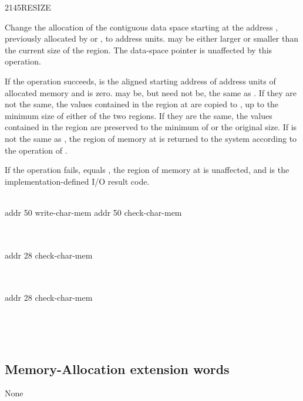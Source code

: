 \vspace*{-3ex}
\begin{worddef}{2145}{RESIZE}
\item {}

	Change the allocation of the contiguous data space starting at
	the address , previously allocated by
	 or , to  address units.
	 may be either larger or smaller than the current
	size of the region. The data-space pointer is unaffected by
	this operation.

	If the operation succeeds,  is the aligned
	starting address of  address units of allocated memory
	and  is zero.  may be, but need
	not be, the same as . If they are not the same,
	the values contained in the region at  are copied
	to , up to the minimum size of either of the
	two regions. If they are the same, the values contained in the
	region are preserved to the minimum of  or the original
	size.  If  is not the same as ,
	the region of memory at  is returned to the system
	according to the operation of .

	If the operation fails,  equals ,
	the region of memory at  is unaffected, and
	 is the implementation-defined I/O result code.


	\begin{testing} %
		\ttfamily
		 \\
		addr  50 write-char-mem addr  50 check-char-mem

		  \\
		 \\
		addr  28 check-char-mem

		  \\
		 \\
		addr  28 check-char-mem

		  \\

		 \\
		 \tab {} 
	\end{testing}
\end{worddef}

\vspace*{-2ex}
\subsection{Memory-Allocation extension words} %

None
